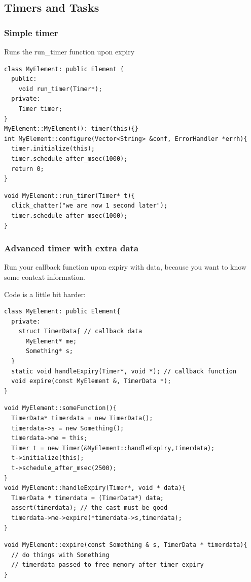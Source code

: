 \documentclass{beamer}
\begin{document}
\subsection{Timers and Tasks} %
\label{sub:timers_and_tasks}

\begin{frame}
\frametitle{Simple timer}
Runs the run\_timer function upon expiry
\begin{lstlisting}[basicstyle=\footnotesize]
class MyElement: public Element {
  public:
    void run_timer(Timer*);
  private:
    Timer timer;
}
MyElement::MyElement(): timer(this){}
int MyElement::configure(Vector<String> &conf, ErrorHandler *errh){
  timer.initialize(this);
  timer.schedule_after_msec(1000);
  return 0;
}
\end{lstlisting}
\begin{lstlisting}[basicstyle=\footnotesize]
void MyElement::run_timer(Timer* t){
  click_chatter("we are now 1 second later");
  timer.schedule_after_msec(1000);
}
\end{lstlisting}
\end{frame}

\begin{frame}
\frametitle{Advanced timer with extra data}
Run your callback function upon expiry with data, because you want to know some context information.

Code is a little bit harder:
\begin{lstlisting}[basicstyle=\footnotesize]
class MyElement: public Element{
  private:
    struct TimerData{ // callback data
      MyElement* me;
      Something* s;
  }
  static void handleExpiry(Timer*, void *); // callback function
  void expire(const MyElement &, TimerData *);
}
\end{lstlisting}
\begin{lstlisting}[basicstyle=\footnotesize]
void MyElement::someFunction(){
  TimerData* timerdata = new TimerData();
  timerdata->s = new Something();
  timerdata->me = this;
  Timer t = new Timer(&MyElement::handleExpiry,timerdata);
  t->initialize(this);
  t->schedule_after_msec(2500);
}
void MyElement::handleExpiry(Timer*, void * data){
  TimerData * timerdata = (TimerData*) data;
  assert(timerdata); // the cast must be good
  timerdata->me->expire(*timerdata->s,timerdata);
}
\end{lstlisting}
\begin{lstlisting}[basicstyle=\footnotesize]
void MyElement::expire(const Something & s, TimerData * timerdata){
  // do things with Something
  // timerdata passed to free memory after timer expiry
}
\end{lstlisting}
\end{frame}
\end{document}
